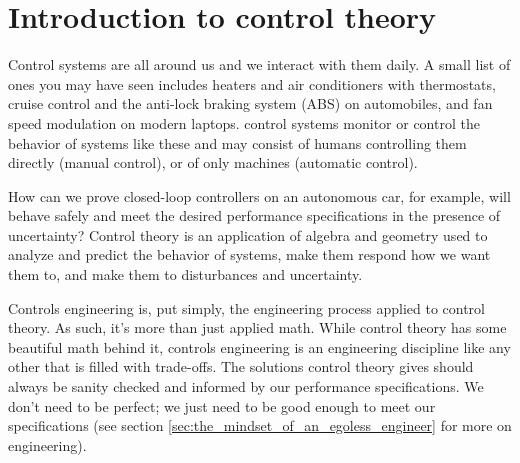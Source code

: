 
\chapter{Introduction to control theory}

Control systems are all around us and we interact with them daily. A small list
of ones you may have seen includes heaters and air conditioners with
thermostats, cruise control and the anti-lock braking system (ABS) on
automobiles, and fan speed modulation on modern laptops. \Glspl{control system}
monitor or control the behavior of \glspl{system} like these and may consist of
humans controlling them directly (manual control), or of only machines
(automatic control).

How can we prove closed-loop \glspl{controller} on an autonomous car, for
example, will behave safely and meet the desired performance specifications in
the presence of uncertainty? Control theory is an application of algebra and
geometry used to analyze and predict the behavior of \glspl{system}, make them
respond how we want them to, and make them  to
\glspl{disturbance} and uncertainty.

Controls engineering is, put simply, the engineering process applied to control
theory. As such, it's more than just applied math. While control theory has some
beautiful math behind it, controls engineering is an engineering discipline like
any other that is filled with trade-offs. The solutions control theory gives
should always be sanity checked and informed by our performance specifications.
We don't need to be perfect; we just need to be good enough to meet our
specifications (see section \ref{sec:the_mindset_of_an_egoless_engineer} for
more on engineering).

\renewcommand*{\chapterpath}{\partpath/introduction-to-control-theory}


